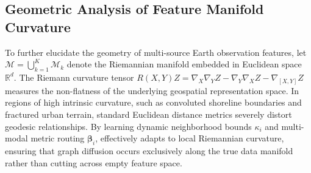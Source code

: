 \subsection{Geometric Analysis of Feature Manifold Curvature}
To further elucidate the geometry of multi-source Earth observation features, let $\mathcal{M} = \bigcup_{k=1}^K \mathcal{M}_k$ denote the Riemannian manifold embedded in Euclidean space $\mathbb{R}^d$. The Riemann curvature tensor $R(X, Y)Z = \nabla_X \nabla_Y Z - \nabla_Y \nabla_X Z - \nabla_{[X,Y]} Z$ measures the non-flatness of the underlying geospatial representation space. In regions of high intrinsic curvature, such as convoluted shoreline boundaries and fractured urban terrain, standard Euclidean distance metrics severely distort geodesic relationships. By learning dynamic neighborhood bounds $\kappa_i$ and multi-modal metric routing $\bm{\beta}_i$, \rllctim{} effectively adapts to local Riemannian curvature, ensuring that graph diffusion occurs exclusively along the true data manifold rather than cutting across empty feature space.
